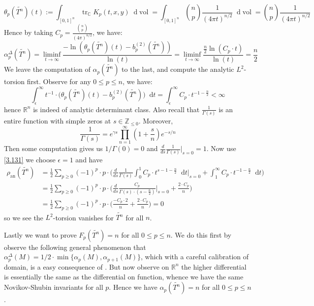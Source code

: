 \documentclass[11pt]{report}
\theoremstyle{definition}
\theoremstyle{plain}
\DeclareMathOperator{\tr}{tr}
\DeclareMathOperator{\vol}{vol}
\newcommand{\real}{\mathbb{R}}
\newcommand{\complex}{\mathbb{C}}
\newcommand{\integer}{\mathbb{Z}}
\renewcommand{\tilde}{\widetilde}
\newcommand{\mass}[1]{\mathop{}\mathrm{d}{#1}}
\begin{document}
\begin{equation}
\theta_p(\tilde{T^n})(t):=\int_{[0,1]^n}\tr_{\complex}K_p(t,x,y)\mass{\vol}=\int_{[0,1]^n}{n \choose p}\frac{1}{(4\pi t)^{n/2}}\mass{\vol}={n \choose p}\frac{1}{(4\pi t)^{n/2}}
\end{equation}
Hence by taking $C_p=\frac{{n\choose p}}{(4\pi)^{n/2}}$, we have:
\begin{equation*}
\alpha^\Delta_p(\tilde{T^n})=\liminf_{t\to \infty}\frac{-\ln(\theta_p(\tilde{T^n})(t)-b_p^{(2)}(\tilde{T^n}))}{\ln(t)}=\liminf_{t\to \infty}\frac{\frac{n}{2}\ln(C_p\cdot t)}{\ln(t)}=\frac{n}{2}
\end{equation*}
We leave the computation of $\alpha_p(\tilde{T^n})$ to the last, and compute the analytic $L^2$-torsion first. Observe for any $0\leq p\leq n$, we have:
\begin{equation}
\int_{\epsilon}^{\infty}t^{-1}\cdot\Big(\theta_p(\tilde{T^n})(t)-b_p^{(2)}(\tilde{T^n})\Big)\mass{t}=\int_{\epsilon}^{\infty} C_p\cdot t^{-1-\frac{n}{2}}<\infty
\end{equation}
hence $\real^n$ is indeed of analytic determinant class. Also recall \cite[Chapter~6, Theorem~1.6 \& 1.7]{stein2003} that $\frac{1}{\Gamma(s)}$ is an entire function with simple zeros at $s\in \integer_{\leq 0}$. Moreover, 
\begin{equation}\label{stein6.1.7}
\frac{1}{\Gamma(s)}=e^{\gamma s}\prod_{n=1}^{\infty}(1+\frac{s}{n})e^{-s/n}
\end{equation}
Then some computation gives us $1/\Gamma(0)=0$ and $\frac{d}{ds}\frac{1}{\Gamma(s)}|_{s=0}=1$. Now use \ref{3.131} we choose $\epsilon=1$ and have
\begin{equation}
\begin{split}
\rho_{\mathrm{an}}(\tilde{T^n})&=\frac{1}{2}\sum_{p \geq 0}(-1)^p\cdot p\cdot\Bigg(\frac{d}{ds}\frac{1}{\Gamma(s)}\int^1_0C_p\cdot t^{s-1-\frac{n}{2}}\mass{t}\Big|_{s=0}+\int_{1}^{\infty}C_p\cdot t^{-1-\frac{n}{2}}\mass{t}\Bigg)\\
&=\frac{1}{2}\sum_{p \geq 0}(-1)^p\cdot p\cdot\Big(\frac{d}{ds}\frac{C_p}{\Gamma(s)\cdot (s-\frac{n}{2})}\Big|_{s=0}+\frac{2\cdot C_p}{n}\Big)\\
&=\frac{1}{2}\sum_{p \geq 0}(-1)^p\cdot p\cdot\Big(\frac{-C_p\cdot2}{n}+\frac{2\cdot C_p}{n}\Big)=0
\end{split}
\end{equation}
so we see the $L^2$-torsion vanishes for $\tilde{T^n}$ for all $n$. 
\par Lastly we want to prove $F_p(\tilde{T^n})=n$ for all $0\leq p\leq n$. We do this first by observe the following general phenomenon that $\alpha_p^{\Delta}(M)=1/2\cdot \min\{\alpha_p(M), \alpha_{p+1}(M)\}$, which with a careful calibration of domain, is a easy consequence of . But now observe on $\real^n$ the higher differential is essentially the same as the differential on function, whence we have the same Novikov-Shubin invariants for all $p$. Hence we have $\alpha_p(\tilde{T^n})=n$ for all $0\leq p\leq n$.
\end{document}
